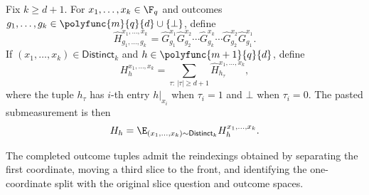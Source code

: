 \begin{definition}\label{def:pasted-measurement}
	\leanok
	Fix $k \ge d+1$. For $x_1,\dots,x_k \in \F_q$ and outcomes $g_1,\dots,g_k \in \polyfunc{m}{q}{d}\cup\{\bot\}$, define
	\[
		\widehat H_{g_1,\dots,g_k}^{x_1,\dots,x_k}
		=
		\widehat G_{g_1}^{x_1}\widehat G_{g_2}^{x_2}\cdots \widehat G_{g_k}^{x_k}\cdots \widehat G_{g_2}^{x_2}\widehat G_{g_1}^{x_1}.
	\]
	If $(x_1,\dots,x_k)\in \mathsf{Distinct}_k$ and $h \in \polyfunc{m+1}{q}{d}$, define
	\[
		H_h^{x_1,\dots,x_k}
		=
		\sum_{\tau:\,|\tau|\ge d+1} \widehat H_{h_\tau}^{x_1,\dots,x_k},
	\]
	where the tuple $h_\tau$ has $i$-th entry $h|_{x_i}$ when $\tau_i=1$ and $\bot$ when $\tau_i=0$. The pasted submeasurement is then
	\[
		H_h = \E_{(x_1,\dots,x_k)\sim \mathsf{Distinct}_k} H_h^{x_1,\dots,x_k}.
	\]
\end{definition}

\begin{definition}\label{def:completed-outcome-reindexing}
	\leanok
	The completed outcome tuples admit the reindexings obtained by separating the
	first coordinate, moving a third slice to the front, and identifying the
	one-coordinate split with the original slice question and outcome spaces.
\end{definition}

